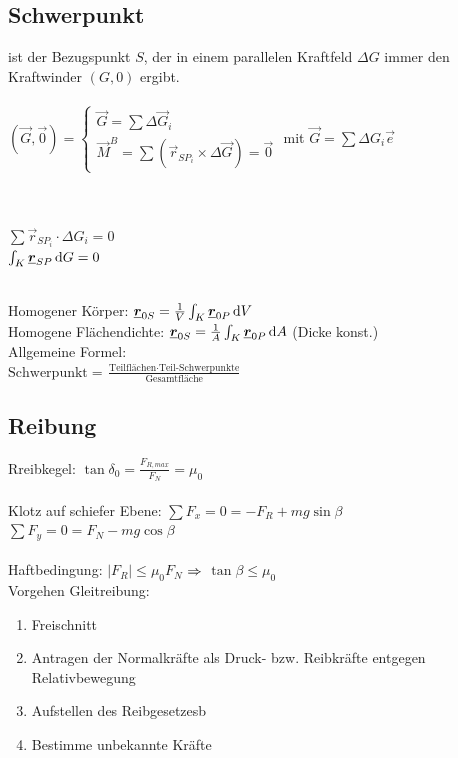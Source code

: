 \documentclass[fs, footer]{latex4ei}
\begin{document}
\begin{multicols}{4}
	\subsection{Schwerpunkt}
	ist der Bezugspunkt $S$, der in einem parallelen Kraftfeld $\Delta G$ immer den Kraftwinder $(G,0)$ ergibt. \\  \\ 
	$(\vec G,\vec 0) = \begin{cases} \vec G = \sum \Delta \vec G_i \\ \vec M^B = \sum (\vec r_{SP_i} \times \Delta \vec G) = \vec 0 \end{cases}$
	mit $\vec G = \sum \Delta G_i \vec e$\\ \\  \\ 
	\parbox{4.0cm}{
	$\sum \vec r_{SP_i} \cdot \Delta G_i = 0$\\ 
	$\int_K \vec r_{SP} \diff G = 0$} \parbox{2.5cm}{ }
	\\
	Homogener Körper: $\vec r_{0S} = \frac{1}{V} \int_K \vec r_{0P} \diff V$\\
	Homogene Flächendichte: $\vec r_{0S} = \frac{1}{A} \int_K \vec r_{0P} \diff A$ (Dicke konst.)\\
	
	Allgemeine Formel: \\
	$\text{Schwerpunkt} = \frac{\text{Teilflächen} \cdot \text{Teil-Schwerpunkte}}{\text{Gesamtfläche}}$\\
	
	
	\subsection{Reibung}
	Rreibkegel: $\tan \delta_0 = \frac{F_{R,max}}{F_N} = \mu_0$\\
	\\
	Klotz auf schiefer Ebene:
	$\sum F_x = 0 = -F_R + m g \sin \beta$\\
	$\sum F_y = 0 = F_N - m g \cos \beta$\\
	\\
	Haftbedingung: $|F_R| \le \mu_0 F_N$ \quad $\Rightarrow$ \quad $\tan \beta \le \mu_0$\\
	
	Vorgehen Gleitreibung:

	\begin{enumerate}
		\item Freischnitt
		\item Antragen der Normalkräfte als Druck- bzw. Reibkräfte entgegen Relativbewegung
		\item Aufstellen des Reibgesetzesb
		\item Bestimme unbekannte Kräfte
	\end{enumerate}


\end{multicols}
\end{document}
